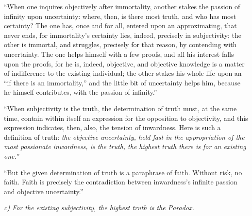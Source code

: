 \documentclass[12pt]{book}
\begin{document}
``When one inquires objectively after immortality, another stakes the passion of infinity upon uncertainty: where, then, is there most truth, and who has most certainty? The one has, once and for all, entered upon an approximating, that never ends, for immortality's certainty lies, indeed, precisely in subjectivity; the other is immortal, and struggles, precisely for that reason, by contending with uncertainty. The one helps himself with a few proofs, and all his interest falls upon the proofs, for he is, indeed, objective, and objective knowledge is a matter of indifference to the existing individual; the other stakes his whole life upon an ``if there is an immortality,'' and the little bit of uncertainty helps him, because he himself contributes, with the passion of infinity.''

``When subjectivity is the truth, the determination of truth must, at the same time, contain within itself an expression for the opposition to objectivity, and this expression indicates, then, also, the tension of inwardness. Here is such a definition of truth: \emph{the objective uncertainty, held fast in the appropriation of the most passionate inwardness, is the truth, the highest truth there is for an existing one.}''

``But the given determination of truth is a paraphrase of faith. Without risk, no faith. Faith is precisely the contradiction between inwardness's infinite passion and objective uncertainty.''

\begin{center}
\emph{c) For the existing subjectivity, the highest truth
is the Paradox.}
\end{center}
\end{document}

